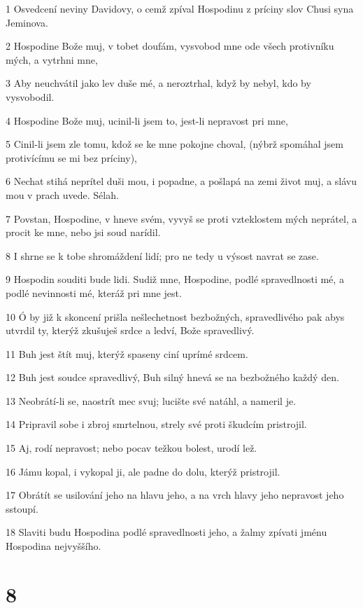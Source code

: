 \par 1 Osvedcení neviny Davidovy, o cemž zpíval Hospodinu z príciny slov Chusi syna Jeminova.
\par 2 Hospodine Bože muj, v tobet doufám, vysvobod mne ode všech protivníku mých, a vytrhni mne,
\par 3 Aby neuchvátil jako lev duše mé, a neroztrhal, když by nebyl, kdo by vysvobodil.
\par 4 Hospodine Bože muj, ucinil-li jsem to, jest-li nepravost pri mne,
\par 5 Cinil-li jsem zle tomu, kdož se ke mne pokojne choval, (nýbrž spomáhal jsem protivícímu se mi bez príciny),
\par 6 Nechat stihá neprítel duši mou, i popadne, a pošlapá na zemi život muj, a slávu mou v prach uvede. Sélah.
\par 7 Povstan, Hospodine, v hneve svém, vyvyš se proti vzteklostem mých neprátel, a procit ke mne, nebo jsi soud narídil.
\par 8 I shrne se k tobe shromáždení lidí; pro ne tedy u výsost navrat se zase.
\par 9 Hospodin souditi bude lidi. Sudiž mne, Hospodine, podlé spravedlnosti mé, a podlé nevinnosti mé, kteráž pri mne jest.
\par 10 Ó by již k skoncení prišla nešlechetnost bezbožných, spravedlivého pak abys utvrdil ty, kterýž zkušuješ srdce a ledví, Bože spravedlivý.
\par 11 Buh jest štít muj, kterýž spaseny ciní uprímé srdcem.
\par 12 Buh jest soudce spravedlivý, Buh silný hnevá se na bezbožného každý den.
\par 13 Neobrátí-li se, naostrít mec svuj; lucište své natáhl, a nameril je.
\par 14 Pripravil sobe i zbroj smrtelnou, strely své proti škudcím pristrojil.
\par 15 Aj, rodí nepravost; nebo pocav težkou bolest, urodí lež.
\par 16 Jámu kopal, i vykopal ji, ale padne do dolu, kterýž pristrojil.
\par 17 Obrátít se usilování jeho na hlavu jeho, a na vrch hlavy jeho nepravost jeho sstoupí.
\par 18 Slaviti budu Hospodina podlé spravedlnosti jeho, a žalmy zpívati jménu Hospodina nejvyššího.

\chapter{8}

